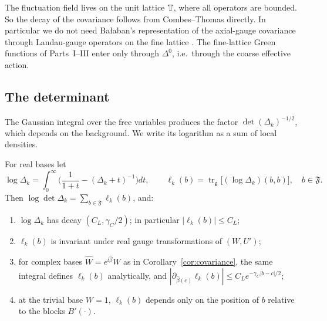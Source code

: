 The fluctuation field lives on the unit lattice $\mathbb T$, where all operators are bounded. So the decay of the covariance follows from Combes--Thomas directly. In particular we do not need Ba\l aban's representation of the axial-gauge covariance through Landau-gauge operators on the fine lattice \cite[(3.183)--(3.185)]{BalBackground}. The fine-lattice Green functions of Parts~I--III enter only through $\Delta^0$, i.e.\ through the coarse effective action.

\subsection{The determinant}

The Gaussian integral over the free variables produces the factor $\det(\Delta_k)^{-1/2}$, which depends on the background. We write its logarithm as a sum of local densities.

\begin{proposition}\label{prop:det-densities}
For real bases let
\[
\log\Delta_k=\int_0^\infty\Big(\frac1{1+t}-(\Delta_k+t)^{-1}\Big)dt,\qquad\ell_k(b)=\operatorname{tr}_{\mathfrak g}\big[(\log\Delta_k)(b,b)\big],\quad b\in\mathfrak F .
\]
Then $\log\det\Delta_k=\sum_{b\in\mathfrak F}\ell_k(b)$, and:
\begin{enumerate}[label=(\alph*)]
\item $\log\Delta_k$ has decay $(C_L,\gamma_C/2)$; in particular $|\ell_k(b)|\le C_L$;
\item $\ell_k(b)$ is invariant under real gauge transformations of $(W,U')$;
\item for complex bases $\hat W=e^{\ii\hat\beta}W$ as in Corollary~\ref{cor:covariance}, the same integral defines $\ell_k(b)$ analytically, and $|\partial_{\hat\beta(c)}\ell_k(b)|\le C_Le^{-\gamma_C|b-c|/2}$;
\item at the trivial base $W=1$, $\ell_k(b)$ depends only on the position of $b$ relative to the blocks $B'(\cdot)$.
\end{enumerate}
\end{proposition}


